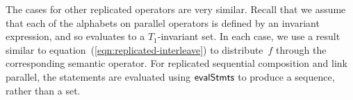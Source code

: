 
The cases for other replicated operators are very similar.  Recall that we
assume that each of the alphabets on parallel operators is defined by an
invariant expression, and so evaluates to a $T_1$-invariant set.  In each case,
we use a result similar to equation~(\ref{eqn:replicated-interleave}) to
distribute~$f$ through the corresponding semantic operator.  For replicated
sequential composition and link parallel, the statements are evaluated using
$\mathop{\sf evalStmts}$ to produce a sequence, rather than a set. 



